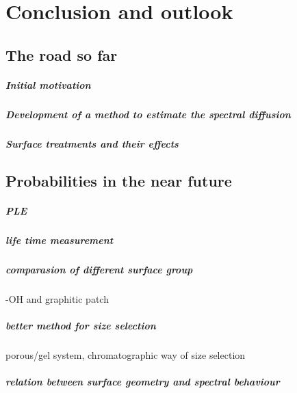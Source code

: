 \chapter{Conclusion and outlook} %

\label{Chapter3} %


\section{The road so far}

\paragraph{Initial motivation}

\paragraph{Development of a method to estimate the spectral diffusion}

\paragraph{Surface treatments and their effects}

\section{ Probabilities in the near future}

\paragraph{PLE}

\paragraph{life time measurement}

\paragraph{comparasion of different surface group}
-OH and graphitic patch
\paragraph{better method for size selection}
porous/gel system, chromatographic way of size selection
\paragraph{relation between surface geometry and spectral behaviour}

